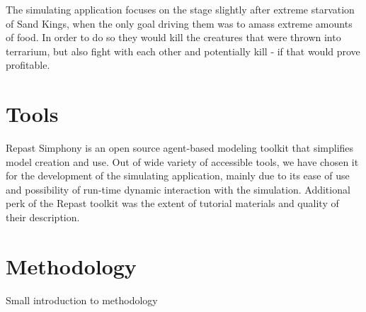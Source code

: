 \documentclass[conference]{IEEEtran}
\begin{document}
The simulating application focuses on the stage slightly after extreme starvation of Sand Kings, when the only goal driving them was to amass extreme amounts of food. In order to do so they would kill the creatures that were thrown into terrarium, but also fight with each other and potentially kill - if that would prove profitable.










\section{Tools}

Repast Simphony is an open source agent-based modeling toolkit that simplifies model creation and use. Out of wide variety of accessible tools, we have chosen it for the development of the simulating application, mainly due to its ease of use and possibility of run-time dynamic interaction with the simulation.
Additional perk of the Repast toolkit was the extent of tutorial materials and quality of their description.










\section{Methodology}
Small introduction to methodology








\end{document}
